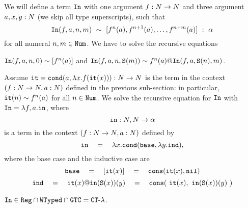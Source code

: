 \begin{Eg}
We will define a term ${\tt In}$ with one argument $f:{N} \rightarrow {N}$ and three argument
$a,x,y:{N}$ (we skip all type superscripts), such that 
\[
{\tt In}(f,a,n,m) \  \sim \ [f^n(a), f^{n+1}(a), \ldots, f^{n+m}(a)] \  : \ \alpha
\]
for all numeral $n,m \in {\tt Num}$. 
We have to solve the recursive equations 
\begin{center}
  ${\tt In}(f,a,n,0) \sim [f^n(a)]$
  \quad
  and
  \quad
  ${\tt In}(f,a,n,{\tt S} (m))  \sim f^n(a) @ {\tt In}(f,a,{\tt S}(n),m)$.
\end{center}
Assume ${\tt it} = {\tt cond} (a, \lambda x.f({\tt it}(x))):{N} \rightarrow {N}$ is the term
in the context $(f:{N}\rightarrow{N}, a:{N})$ defined 
in the previous sub-section: in particular, ${\tt it}(n) \sim f^n(a)$ for all $n \in {\tt Num}$.
We solve the recursive equation for ${\tt In}$ with ${\tt In} = \lambda f,a.{\tt in}$,
where 
\[
{\tt in}:{N},{N} \rightarrow \alpha
\]
is a term in the context $(f:{N}\rightarrow{N}, a:{N})$ defined by 
\[
\interval 
\ \ \ = \ \ \ 
\lambda x.\cond (\base,  \lambda y.\inductive),
\]
where the base case and the inductive case are
\[
\base 
\ \ \ =\ \ \  
[\iter(x)]
\ \ \ =\ \ \ 
\cons(\iter(x),\nil)
\]
\[
\inductive 
\ \ \ = \ \ \ 
\iter(x) @ \interval(\Succ(x))(y)
\ \ \ = \ \ \  
\cons(\ \iter(x), \ \interval(\Succ(x))(y) \ )
\]
\end{Eg}

\begin{proposition}
${\tt In} \in {\tt Reg} \cap {\tt WTyped} \cap {\tt GTC} = { {\tt CT}\mbox{-}\lambda}$.
\end{proposition}


